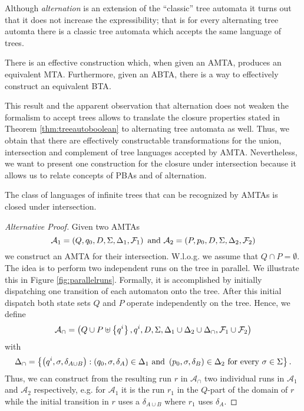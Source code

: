 Although \emph{alternation} is an extension of the \enquote{classic} tree 
automata it turns out that it does not increase the expressibility; that is
for every alternating tree automta there is a classic tree automata which 
accepts the same language of trees.
\begin{theorem}
  \cite[Theorem 1.2]{SimAltTreeAuto}
  There is an effective construction which, when given an \ac{AMTA}, produces 
  an equivalent \ac{MTA}. Furthermore, given an \ac{ABTA}, there is a way to 
  effectively construct an equivalent \ac{BTA}.
  \label{thm:treesimulation}
\end{theorem}
This result and the apparent observation that alternation does not weaken the 
formalism to accept trees allows to translate the closure properties stated in 
Theorem \ref{thm:treeautoboolean} to alternating tree automata as well. Thus, 
we obtain that there are effectively constructable transformations for the 
union, intersection and complement of tree languages accepted by \ac{AMTA}. 
Nevertheless, we want to present one construction for the closure under 
intersection because it allows us to relate concepts of \acp{PBA} and of
alternation.
\begin{corollary}
  The class of languages of infinite trees that can be recognized by \acp{AMTA}
  is closed under intersection.
\end{corollary}
\begin{proof}[Alternative Proof]
  Given two \acp{AMTA}
  \begin{equation*}
    \mathcal{A}_{1} = \left(Q, q_{0}, D, \Sigma, \Delta_{1}, \mathcal{F}_{1}\right)
      \text{ and }
    \mathcal{A}_{2} = \left(P, p_{0}, D, \Sigma, \Delta_{2}, \mathcal{F}_{2}\right)
  \end{equation*}
  we construct an \ac{AMTA} for their intersection. W.l.o.g. we assume that 
  $Q\cap P = \emptyset$. The idea is to perform two independent runs on the 
  tree in parallel. We illustrate this in Figure \ref{fig:parallelruns}. 
  Formally, it is accomplished by initially dispatching one transition of each 
  automaton onto the tree. After this initial dispatch both state sets $Q$ and
  $P$ operate independently on the tree. Hence, we define
  \begin{equation*}
    \mathcal{A}_{\cap} = \left(
      Q\cup P\uplus\left\{q^{i}\right\}, q^{i}, D, \Sigma, 
      \Delta_{1}\cup\Delta_{2}\cup\Delta_{\cap}, 
      \mathcal{F}_{1}\cup\mathcal{F}_{2}
    \right)
  \end{equation*}
  with
  \begin{equation*}
    \Delta_{\cap} = \left\{
      \left(q^{i},\sigma,\delta_{A\cup B}\right):
        \left(q_{0},\sigma,\delta_{A}\right)\in\Delta_{1}
      \text{ and }
        \left(p_{0},\sigma,\delta_{B}\right)\in\Delta_{2}
      \text{ for every }
        \sigma\in\Sigma
    \right\}.
  \end{equation*}
  Thus, we can construct from the resulting run $r$ in $\mathcal{A}_{\cap}$ two
  individual runs in $\mathcal{A}_{1}$ and $\mathcal{A}_{2}$ respectively, e.g.
  for $\mathcal{A}_{1}$ it is the run $r_{1}$ in the $Q$-part of the domain of 
  $r$ while the initial transition in $r$ uses a $\delta_{A\cup B}$ where 
  $r_{1}$ uses $\delta_{A}$.
\end{proof}

